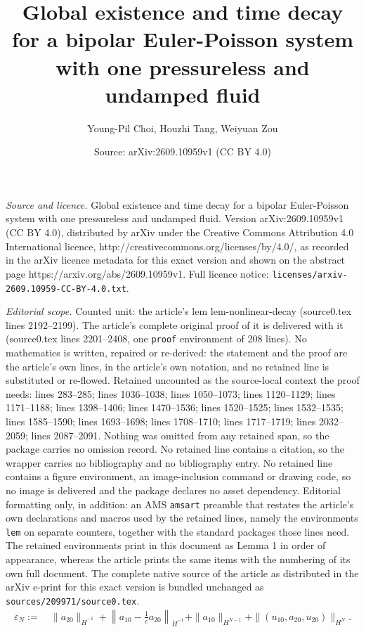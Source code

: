 \documentclass[10pt,a4paper]{amsart}
\title{Global existence and time decay for a bipolar Euler-Poisson system with one pressureless and undamped fluid}
\author{Young-Pil Choi, Houzhi Tang, Weiyuan Zou}
\date{Source: arXiv:2609.10959v1 (CC BY 4.0)}
\begin{document}
\maketitle

\noindent\emph{Source and licence.} Global existence and time decay for a bipolar Euler-Poisson system with one pressureless and undamped fluid. Version arXiv:2609.10959v1 (CC BY 4.0), distributed by arXiv under the Creative Commons Attribution 4.0 International licence, http://creativecommons.org/licenses/by/4.0/, as recorded in the arXiv licence metadata for this exact version and shown on the abstract page https://arxiv.org/abs/2609.10959v1. Full licence notice: \texttt{licenses/arxiv-2609.10959-CC-BY-4.0.txt}.\par\smallskip

\noindent\textit{Editorial scope.} Counted unit: the article's lem lem-nonlinear-decay (source0.tex lines 2192--2199). The article's complete original proof of it is delivered with it (source0.tex lines 2201--2408, one \texttt{proof} environment of 208 lines). No mathematics is written, repaired or re-derived: the statement and the proof are the article's own lines, in the article's own notation, and no retained line is substituted or re-flowed.  Retained uncounted as the source-local context the proof needs: lines 283--285; lines 1036--1038; lines 1050--1073; lines 1120--1129; lines 1171--1188; lines 1398--1406; lines 1470--1536; lines 1520--1525; lines 1532--1535; lines 1585--1590; lines 1693--1698; lines 1708--1710; lines 1717--1719; lines 2032--2059; lines 2087--2091.  Nothing was omitted from any retained span, so the package carries no omission record.  No retained line contains a citation, so the wrapper carries no bibliography and no bibliography entry.  No retained line contains a figure environment, an image-inclusion command or drawing code, so no image is delivered and the package declares no asset dependency.  Editorial formatting only, in addition: an AMS \texttt{amsart} preamble that restates the article's own declarations and macros used by the retained lines, namely the environments \texttt{lem} on separate counters, together with the standard packages those lines need.  The retained environments print in this document as Lemma 1 in order of appearance, whereas the article prints the same items with the numbering of its own full document.  The complete native source of the article as distributed in the arXiv e-print for this exact version is bundled unchanged as \texttt{sources/209971/source0.tex}.
\begin{align}\label{main-smallness}
\varepsilon_N:=&\ \|a_{20}\|_{\dot H^{-1}} +\left\|a_{10}-\frac1c a_{20}\right\|_{\dot H^{-1}} +\|a_{10}\|_{H^{N-1}} +\|(u_{10},a_{20},u_{20})\|_{H^N}.
\end{align}
\end{document}
